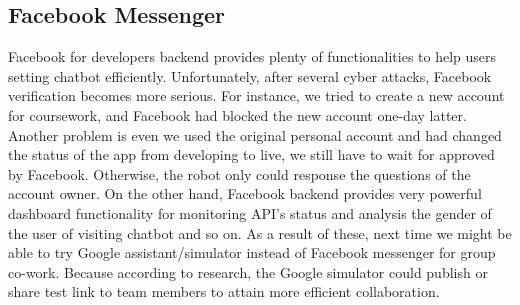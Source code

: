 \documentclass[12pt,a4paper]{article}
\begin{document}
    \subsection{Facebook Messenger}
    Facebook for developers backend provides plenty of functionalities to help users setting chatbot efficiently. Unfortunately, after several cyber attacks, Facebook verification becomes more serious. For instance, we tried to create a new account for coursework, and Facebook had blocked the new account one-day latter. Another problem is even we used the original personal account and had changed the status of the app from developing to live, we still have to wait for approved by Facebook. Otherwise, the robot only could response the questions of the account owner. On the other hand, Facebook backend provides very powerful dashboard functionality for monitoring API's status and analysis the gender of the user of visiting chatbot and so on.
    As a result of these, next time we might be able to try Google assistant/simulator instead of Facebook messenger for group co-work. Because according to research, the Google simulator could publish or share test link to team members to attain more efficient collaboration.
    
    
    
    
\end{document}
